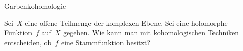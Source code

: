 \documentclass{uebblatt}
\begin{document}
\begin{aufgabeE}{Garbenkohomologie}
\item Sei~$X$ eine offene Teilmenge der komplexen Ebene. Sei eine holomorphe
Funktion~$f$ auf~$X$ gegeben. Wie kann man mit kohomologischen Techniken
entscheiden, ob~$f$ eine Stammfunktion besitzt?
\end{aufgabeE}
\end{document}
